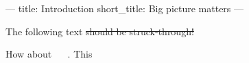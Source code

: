 ---
title: Introduction
short_title: Big picture matters
---

The following text \sout{should be struck-through!}

How about ~~ . This~~

